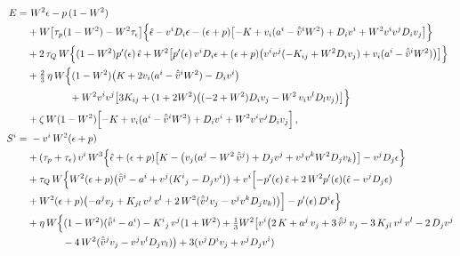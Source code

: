 \documentclass[prd,aps,twocolumn,floats,floatfix,nofootinbib,superscriptaddress] {revtex4-1}
\begin{document}
\begin{widetext}
\begin{align}
    E=&~W^2 \epsilon - p\, (1 - W^2) \nonumber\\
    &+ W\big[\tau_p (1 - W^2)-W^2\tau_\epsilon\big] \Bigl\{\hat\epsilon   -  v^{i} D_{i}\epsilon -  (\epsilon + p) \bigl[-K+v_{i} (a^{i} -  \hat{\bar v}^{i} W^2) + D_{i}v^{i} + W^2 v^{i} v^{j}  D_{i}v_{j}\bigr]\Bigr\} \nonumber\\
    &+2\,\tau_Q\,W\Bigl\{(1 - W^2)p'(\epsilon)\,\hat\epsilon + W^2 \bigl[p'(\epsilon)\, v^{i} D_{i}\epsilon +(\epsilon + p) \bigl(v^{i} v^{j}(- K_{ij} + W^2 D_{i}v_{j}) + v_{i} (a^{i} -  \hat{\bar v}^{i} W^2)\bigr) \bigr]\Bigr\} \nonumber \\ 
    & + \tfrac{2}{3}\,\eta\, W \Big\{ (1 - W^2) \bigl(K + 2 v_{i} (a^{i} -  \hat{\bar v}^{i} W^2) - D_{i}v^{i}\bigr) \nonumber\\
    &\hspace{1.5cm}+ W^2 v^{i} v^{j}  \bigl[3 K_{ij} + (1 + 2 W^2) \bigl((-2 + W^2) D_{i}v_{j} - W^2\,v_{i} v^{l}  D_{l}v_{j}\bigr)\bigr]
    \Big\}\nonumber\\
    &+\zeta\,W (1 - W^2) \Bigl[-K + v_{i} ( a^{i} - \hat{\bar v}^{i} W^2) +  D_{i}v^{i} + W^2 v^{i} v^{j}  D_{i}v_{j}\Bigr]\,, \label{eq:E_fluid_3p1}\\
    S^i=&~- v^{i} \,W^2 (\epsilon+p) \nonumber\\
    &+(\tau_p+\tau_\epsilon)\,v^{i} \,W^3 \Bigl\{\hat\epsilon +  (\epsilon + p)\bigl[K - \bigl(v_{j} (a^{j} - W^2\, \hat{\bar v}^{j} ) + D_{j}v^{j} + v^{j} v^{k} W^2 D_{j}v_{k}\bigr)\bigr] -  v^{j} D_{j}\epsilon\Bigr\}\nonumber\\
    &+\tau_Q\,W \Bigl\{W^2 (\epsilon + p) \bigl(\hat{\bar v}^{i}- a^{i} + v^{j} (K^{i}{}_{j} -  D_{j}v^{i})\bigr) + v^{i} \Bigl[-p'(\epsilon)\, \hat\epsilon+ 2\, W^2 p'(\epsilon)( \hat\epsilon -v^{j} D_{j}\epsilon) \nonumber\\
    & + W^2 (\epsilon + p)\bigl(- a^{j} v_{j}  + K_{jl}\, v^{j}\, v^{l} + 2\, W^2  (\hat{\bar v}^{j} v_{j} -  v^{j} v^{k} D_{j}v_{k})\bigr)\Bigr] -  p'(\epsilon)\, D^{i}\epsilon\Bigr\} \nonumber\\
    &+\eta\,W\Bigl\{ (1 - W^2)(\hat{\bar v}^{i}-a^{i}) -  K^{i}{}_{j}\, v^{j} (1 + W^2) + \tfrac{1}{3} W^2\bigl[
     v^i\bigl(
        2\, K + a^{j}\, v_{j} + 3\, \hat{\bar v}^{j}\, v_{j} - 3 \,K_{jl} \, v^{j} \,v^{l} - 2 \, D_{j}v^{j}\nonumber\\
        &\hspace{1.25cm}- 4\,W^2( \hat{\bar v}^{j} v_{j} -  v^{j} v^{l}  D_{j}v_{l})\bigr) +3(v^{j} D^{i}v_{j}+v^{j} D_{j}v^{i})

\end{align}
\end{widetext}
\end{document}

